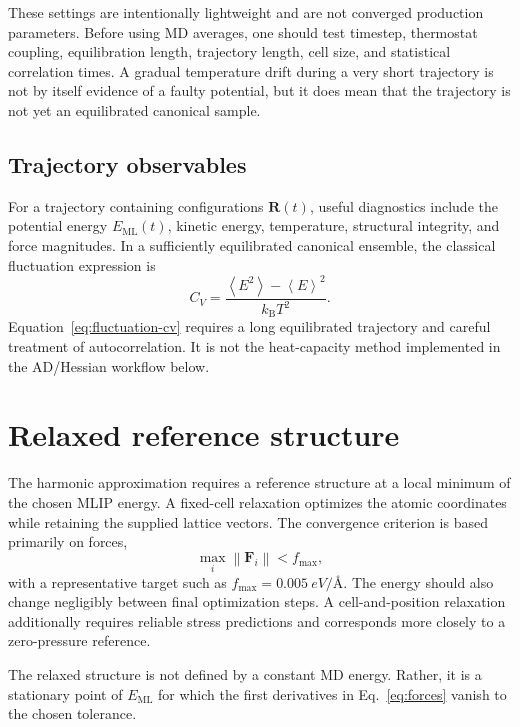 \documentclass[11pt,a4paper]{article}
\begin{document}
These settings are intentionally lightweight and are not converged production parameters. Before using MD averages, one should test timestep, thermostat coupling, equilibration length, trajectory length, cell size, and statistical correlation times. A gradual temperature drift during a very short trajectory is not by itself evidence of a faulty potential, but it does mean that the trajectory is not yet an equilibrated canonical sample.

\subsection{Trajectory observables}

For a trajectory containing configurations $\bm{R}(t)$, useful diagnostics include the potential energy $E_{\mathrm{ML}}(t)$, kinetic energy, temperature, structural integrity, and force magnitudes. In a sufficiently equilibrated canonical ensemble, the classical fluctuation expression is
\begin{equation}
  C_V = \frac{\left\langle E^2 \right\rangle - \left\langle E \right\rangle^2}
  {k_{\mathrm{B}}T^2}.
  \label{eq:fluctuation-cv}
\end{equation}
Equation~\eqref{eq:fluctuation-cv} requires a long equilibrated trajectory and careful treatment of autocorrelation. It is not the heat-capacity method implemented in the AD/Hessian workflow below.

\section{Relaxed reference structure}

The harmonic approximation requires a reference structure at a local minimum of the chosen MLIP energy. A fixed-cell relaxation optimizes the atomic coordinates while retaining the supplied lattice vectors. The convergence criterion is based primarily on forces,
\begin{equation}
  \max_i \left\lVert \bm{F}_i \right\rVert < f_{\mathrm{max}},
\end{equation}
with a representative target such as $f_{\mathrm{max}}=\SI{0.005}{eV\per\angstrom}$. The energy should also change negligibly between final optimization steps. A cell-and-position relaxation additionally requires reliable stress predictions and corresponds more closely to a zero-pressure reference.

The relaxed structure is not defined by a constant MD energy. Rather, it is a stationary point of $E_{\mathrm{ML}}$ for which the first derivatives in Eq.~\eqref{eq:forces} vanish to the chosen tolerance.
\end{document}
